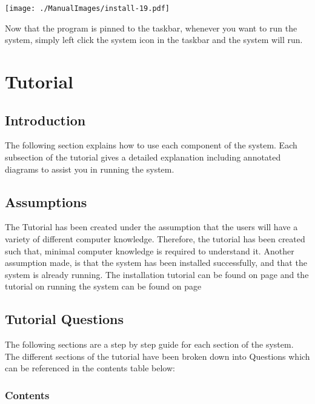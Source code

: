 \texttt{[image: ./ManualImages/install-19.pdf]}

Now that the program is pinned to the taskbar, whenever you want to run the system, simply left click the system icon in the taskbar and the system will run.

\pagebreak

\section{Tutorial}

\subsection{Introduction}
The following section explains how to use each component of the system. Each subsection of the tutorial gives a detailed explanation including annotated diagrams to assist you in running the system.


\subsection{Assumptions}

The Tutorial has been created under the assumption that the users will have a variety of different computer knowledge. Therefore, the tutorial has been created such that, minimal computer knowledge is required to understand it. Another assumption made, is that the system has been installed successfully, and that the system is already running. The installation tutorial can be found on page \pageref{fig:System Installation} and the tutorial on running the system can be found on page \pageref{fig:Running the System}

\subsection{Tutorial Questions}
The following sections are a step by step guide for each section of the system. The different sections of the tutorial have been broken down into Questions which can be referenced in the contents table below:

\pagebreak
\subsubsection{Contents}

